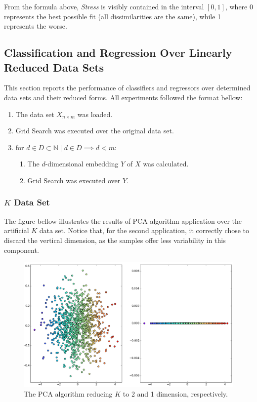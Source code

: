 \documentclass[12pt]{article}
\begin{document}
From the formula above, {\em Stress} is visibly contained in the interval $[0, 1]$, where 0 represents the best possible fit (all dissimilarities are the same), while 1 represents the worse.

\subsection{Classification and Regression Over Linearly Reduced Data Sets}
\label{sec:experiments_linear_ds}

This section reports the performance of classifiers and regressors over determined data sets and their reduced forms. All experiments followed the format bellow:

\begin{enumerate}
	\item The data set $X_{n \times m}$ was loaded.
	\item Grid Search was executed over the original data set.
	\item for $d \in D \subset \mathbb{N} \mid d \in D \implies d < m$:
	\begin{enumerate}
		\item The $d$-dimensional embedding $Y$ of $X$ was calculated.
		\item Grid Search was executed over $Y$.
	\end{enumerate}
\end{enumerate}

\subsubsection{$K$ Data Set}

The figure bellow illustrates the results of PCA algorithm application over the artificial $K$ data set. Notice that, for the second application, it correctly chose to discard the vertical dimension, as the samples offer less variability in this component.

\begin{figure}[H]
	\centering
	\captionsetup{justification=centering}

	\includegraphics[width=.9\linewidth]{experiments/1_1_r_pca}
	\caption{The PCA algorithm reducing $K$ to 2 and 1 dimension, respectively.}
	\label{fig:datasetrpca}
\end{figure}
\end{document}
